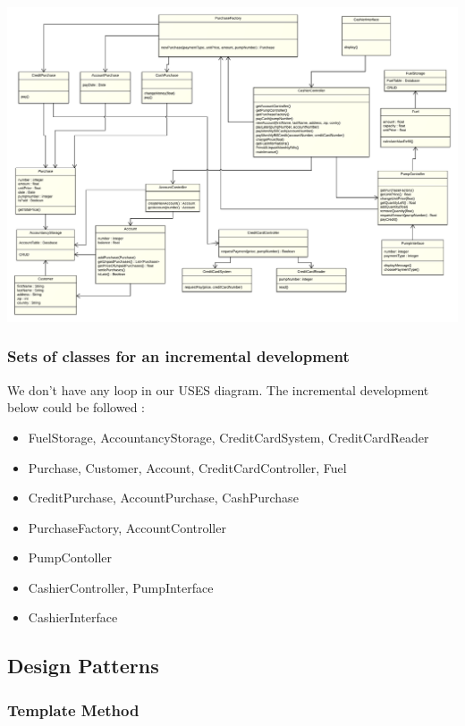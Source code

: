 \documentclass[11pt, a4paper]{article}
\begin{document}
\begin{center}
\centerline{\includegraphics[angle=90, origin=c, width=1\textwidth]{use.png}}
\end{center}

\subsubsection*{Sets of classes for an incremental development}
We don't have any loop in our USES diagram. The incremental development below could be followed : 
\begin{itemize}
\item FuelStorage, AccountancyStorage, CreditCardSystem, CreditCardReader
\item Purchase, Customer, Account, CreditCardController, Fuel
\item CreditPurchase, AccountPurchase, CashPurchase
\item PurchaseFactory, AccountController
\item PumpContoller
\item CashierController, PumpInterface
\item CashierInterface
\end{itemize}

\subsection*{Design Patterns}

\subsubsection{Template Method}
\end{document}
